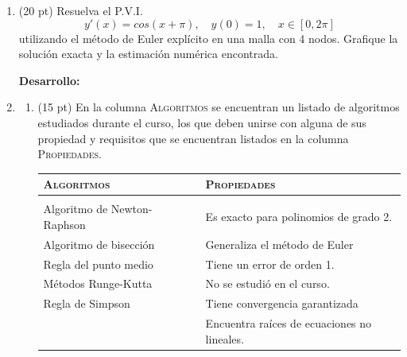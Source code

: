 \documentclass[11pt]{article}
\begin{document}
\begin{enumerate}
\newpage
\item  (20 pt) Resuelva el P.V.I.
$$ 
y'(x)=cos(x+\pi), \quad y(0)=1, \quad x\in[0,2\pi]
$$
utilizando el método de Euler explícito en una malla con 4 nodos. Grafique la soluci\'on exacta y la estimaci\'on num\'erica encontrada.

\textbf{Desarrollo:} 


\newpage
\item  \begin{enumerate}
\item (15 pt) En la columna \textsc{Algoritmos} se encuentran un listado de algoritmos estudiados durante el curso, los que deben unirse con alguna de sus propiedad y requisitos que se encuentran listados en la columna \textsc{Propiedades}.
\begin{center}
	\begin{tabular}{||p{4cm}|p{7cm}|p{4cm}||}
    \hline \hline
	\textsc{Algoritmos}	& & \textsc{Propiedades}    \\ \hline & &\\ \hline  
    Algoritmo de Newton-Raphson & & Es exacto para polinomios de grado 2. \\ \hline
    Algoritmo de bisecci\'on	& & Generaliza el método de Euler\\ \hline
    Regla del punto medio		& & Tiene un error de orden 1.\\ \hline
    M\'etodos Runge-Kutta		& & No se estudi\'o en el curso.\\ \hline
	Regla de Simpson			& & Tiene convergencia garantizada\\ \hline
    							& & Encuentra ra\'ices de ecuaciones no lineales.\\ \hline
   \end{tabular}
\end{center}


\end{enumerate}
\end{enumerate}
\end{document}
